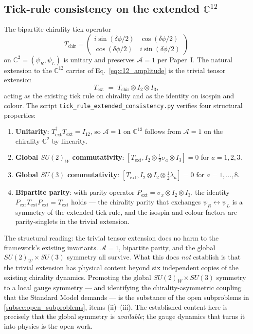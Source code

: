 \subsection{Tick-rule consistency on the extended $\mathbb{C}^{12}$}
\label{subsec:tick_rule_consistency}

The bipartite chirality tick operator
\[
T_\text{chir} = \begin{pmatrix}
  i\sin(\delta\phi/2) & \cos(\delta\phi/2) \\
  \cos(\delta\phi/2)  & i\sin(\delta\phi/2)
\end{pmatrix}
\]
on $\mathbb{C}^2 = (\psi_R, \psi_L)$ is unitary and preserves
$\mathcal{A} = 1$ per Paper~I.  The natural extension to the
$\mathbb{C}^{12}$ carrier of
Eq.~\eqref{eq:c12_amplitude} is the trivial tensor extension
\begin{equation}
\label{eq:trivial_tensor_extension}
T_\text{ext} \;=\; T_\text{chir} \otimes I_2 \otimes I_3,
\end{equation}
acting as the existing tick rule on chirality and as the identity
on isospin and colour.  The script
\nolinkurl{tick_rule_extended_consistency.py} verifies four
structural properties:

\begin{enumerate}
\item \textbf{Unitarity}: $T_\text{ext}^\dagger T_\text{ext} = I_{12}$,
so $\mathcal{A}=1$ on $\mathbb{C}^{12}$ follows from $\mathcal{A}=1$
on the chirality $\mathbb{C}^2$ by linearity.
\item \textbf{Global $SU(2)_W$ commutativity}: $[T_\text{ext}, I_2
\otimes \tfrac{1}{2}\sigma_a \otimes I_3] = 0$ for $a = 1, 2, 3$.
\item \textbf{Global $SU(3)$ commutativity}: $[T_\text{ext}, I_2
\otimes I_2 \otimes \tfrac{1}{2}\lambda_a] = 0$ for $a = 1, \ldots, 8$.
\item \textbf{Bipartite parity}: with parity operator $P_\text{ext}
= \sigma_x \otimes I_2 \otimes I_3$, the identity $P_\text{ext}
T_\text{ext} P_\text{ext} = T_\text{ext}$ holds --- the chirality
parity that exchanges $\psi_R \leftrightarrow \psi_L$ is a
symmetry of the extended tick rule, and the isospin and colour
factors are parity-singlets in the trivial extension.
\end{enumerate}

The structural reading: the trivial tensor extension does no harm
to the framework's existing invariants.  $\mathcal{A}=1$, bipartite
parity, and the global $SU(2)_W \times SU(3)$ symmetry all
survive.  What this does \emph{not} establish is that the trivial
extension has physical content beyond six independent copies of the
existing chirality dynamics.  Promoting the global $SU(2)_W \times
SU(3)$ symmetry to a local gauge symmetry --- and identifying the
chirality-asymmetric coupling that the Standard Model demands --- is
the substance of the open subproblems in
\autoref{subsec:open_subproblems}, items (ii)--(iii).  The
established content here is precisely that the global symmetry is
\emph{available}; the gauge dynamics that turns it into physics is
the open work.

